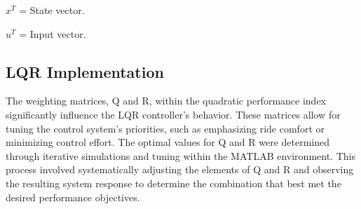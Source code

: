 $x^{T}$ = State vector. 

$u^{T}$ = Input vector.


\subsection{LQR Implementation}
The weighting matrices, Q and R, within the quadratic performance index significantly influence the LQR controller's behavior. These matrices allow for tuning the control system's priorities, such as emphasizing ride comfort or minimizing control effort. The optimal values for Q and R were determined through iterative simulations and tuning within the MATLAB environment. This process involved systematically adjusting the elements of Q and R and observing the resulting system response to determine the combination that best met the desired performance objectives.



